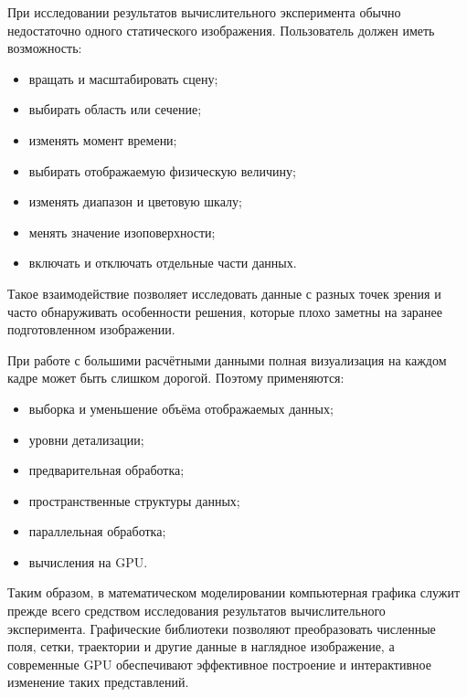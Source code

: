 При исследовании результатов вычислительного эксперимента обычно недостаточно одного статического изображения. Пользователь должен иметь возможность:
\begin{itemize}
	\item вращать и масштабировать сцену;
	\item выбирать область или сечение;
	\item изменять момент времени;
	\item выбирать отображаемую физическую величину;
	\item изменять диапазон и цветовую шкалу;
	\item менять значение изоповерхности;
	\item включать и отключать отдельные части данных.
\end{itemize}

Такое взаимодействие позволяет исследовать данные с разных точек зрения и часто обнаруживать особенности решения, которые плохо заметны на заранее подготовленном изображении.

При работе с большими расчётными данными полная визуализация на каждом кадре может быть слишком дорогой. Поэтому применяются:
\begin{itemize}
	\item выборка и уменьшение объёма отображаемых данных;
	\item уровни детализации;
	\item предварительная обработка;
	\item пространственные структуры данных;
	\item параллельная обработка;
	\item вычисления на GPU.
\end{itemize}

Таким образом, в математическом моделировании компьютерная графика служит прежде всего средством исследования результатов вычислительного эксперимента. Графические библиотеки позволяют преобразовать численные поля, сетки, траектории и другие данные в наглядное изображение, а современные GPU обеспечивают эффективное построение и интерактивное изменение таких представлений.

\newpage